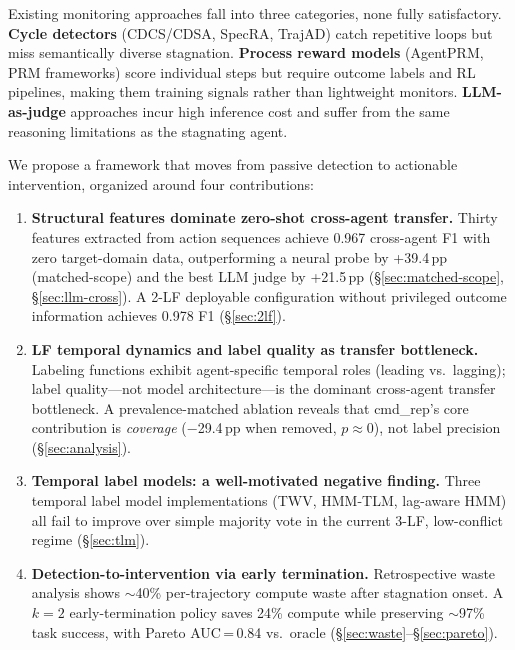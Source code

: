 \documentclass[11pt,a4paper]{article}
\begin{document}
Existing monitoring approaches fall into three categories, none fully satisfactory.
\textbf{Cycle detectors} (CDCS/CDSA, SpecRA, TrajAD) catch repetitive loops but miss semantically diverse stagnation.
\textbf{Process reward models} (AgentPRM, PRM frameworks) score individual steps but require outcome labels and RL pipelines, making them training signals rather than lightweight monitors.
\textbf{LLM-as-judge} approaches incur high inference cost and suffer from the same reasoning limitations as the stagnating agent.

We propose a framework that moves from passive detection to actionable intervention, organized around four contributions:

\begin{enumerate}[leftmargin=*,itemsep=2pt]
\item \textbf{Structural features dominate zero-shot cross-agent transfer.}
Thirty features extracted from action sequences achieve 0.967 cross-agent F1 with zero target-domain data, outperforming a neural probe by +39.4\,pp (matched-scope) and the best LLM judge by +21.5\,pp (\S\ref{sec:matched-scope}, \S\ref{sec:llm-cross}).
A 2-LF deployable configuration without privileged outcome information achieves 0.978 F1 (\S\ref{sec:2lf}).

\item \textbf{LF temporal dynamics and label quality as transfer bottleneck.}
Labeling functions exhibit agent-specific temporal roles (leading vs.\ lagging); label quality---not model architecture---is the dominant cross-agent transfer bottleneck.
A prevalence-matched ablation reveals that cmd\_rep's core contribution is \emph{coverage} ($-$29.4\,pp when removed, $p\approx 0$), not label precision (\S\ref{sec:analysis}).

\item \textbf{Temporal label models: a well-motivated negative finding.}
Three temporal label model implementations (TWV, HMM-TLM, lag-aware HMM) all fail to improve over simple majority vote in the current 3-LF, low-conflict regime (\S\ref{sec:tlm}).

\item \textbf{Detection-to-intervention via early termination.}
Retrospective waste analysis shows $\sim$40\% per-trajectory compute waste after stagnation onset.
A $k{=}2$ early-termination policy saves 24\% compute while preserving $\sim$97\% task success, with Pareto AUC\,=\,0.84 vs.\ oracle (\S\ref{sec:waste}--\S\ref{sec:pareto}).
\end{enumerate}
\end{document}
